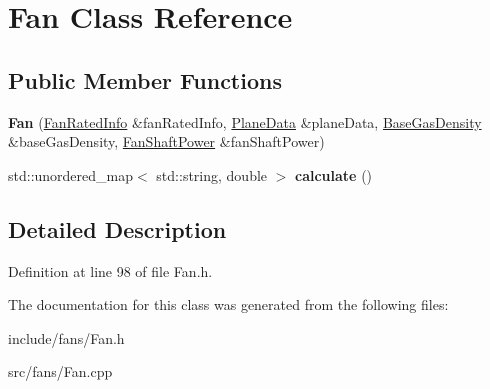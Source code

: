 \hypertarget{class_fan}{}\section{Fan Class Reference}
\label{class_fan}
\subsection*{Public Member Functions}
\begin{DoxyCompactItemize}
\item 
\mbox{\label{class_fan_ad2f666fc0601d5f2c62a0e7d4f940e5f}} 
{\bfseries Fan} (\hyperlink{class_fan_rated_info}{Fan\+Rated\+Info} \&fan\+Rated\+Info, \hyperlink{class_plane_data}{Plane\+Data} \&plane\+Data, \hyperlink{class_base_gas_density}{Base\+Gas\+Density} \&base\+Gas\+Density, \hyperlink{class_fan_shaft_power}{Fan\+Shaft\+Power} \&fan\+Shaft\+Power)
\item 
\mbox{\label{class_fan_aed00ee584d6914bbccc479519f552f36}} 
std\+::unordered\+\_\+map$<$ std\+::string, double $>$ {\bfseries calculate} ()
\end{DoxyCompactItemize}


\subsection{Detailed Description}


Definition at line 98 of file Fan.\+h.



The documentation for this class was generated from the following files\+:\begin{DoxyCompactItemize}
\item 
include/fans/Fan.\+h\item 
src/fans/Fan.\+cpp\end{DoxyCompactItemize}
